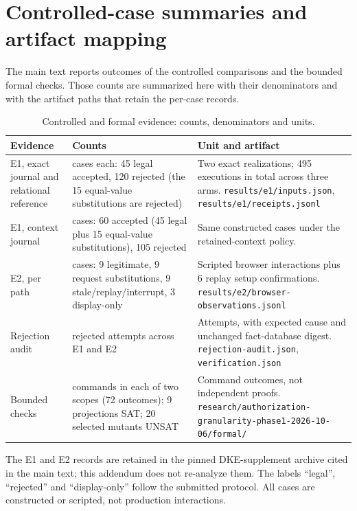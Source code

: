 \documentclass[10pt,a4paper]{article}
\begin{document}
\section{Controlled-case summaries and artifact mapping}
The main text reports outcomes of the controlled comparisons and the bounded formal checks. Those counts are summarized here with their denominators and with the artifact paths that retain the per-case records.

\begin{table}[htbp]
\centering\small
\caption{Controlled and formal evidence: counts, denominators and units.}
\begin{tabularx}{\textwidth}{@{}l>{\raggedright\arraybackslash}p{}X@{}}
\toprule
Evidence & Counts & Unit and artifact \\
\midrule
E1, exact journal and relational reference & 165 cases each: 45 legal accepted, 120 rejected (the 15 equal-value substitutions are rejected) & Two exact realizations; 495 executions in total across three arms. \nolinkurl{results/e1/inputs.json}, \nolinkurl{results/e1/receipts.jsonl} \\
E1, context journal & 165 cases: 60 accepted (45 legal plus 15 equal-value substitutions), 105 rejected & Same constructed cases under the retained-context policy. \\
E2, per path & 30 cases: 9 legitimate, 9 request substitutions, 9 stale/replay/interrupt, 3 display-only & Scripted browser interactions plus 6 replay setup confirmations. \nolinkurl{results/e2/browser-observations.jsonl} \\
Rejection audit & 372 rejected attempts across E1 and E2 & Attempts, with expected cause and unchanged fact-database digest. \nolinkurl{rejection-audit.json}, \nolinkurl{verification.json} \\
Bounded checks & 36 commands in each of two scopes (72 outcomes); 9 projections SAT; 20 selected mutants UNSAT & Command outcomes, not independent proofs. \nolinkurl{research/authorization-granularity-phase1-2026-10-06/formal/} \\
\bottomrule
\end{tabularx}
\end{table}

The E1 and E2 records are retained in the pinned DKE-supplement archive cited in the main text; this addendum does not re-analyze them. The labels ``legal'', ``rejected'' and ``display-only'' follow the submitted protocol. All cases are constructed or scripted, not production interactions.
\end{document}
